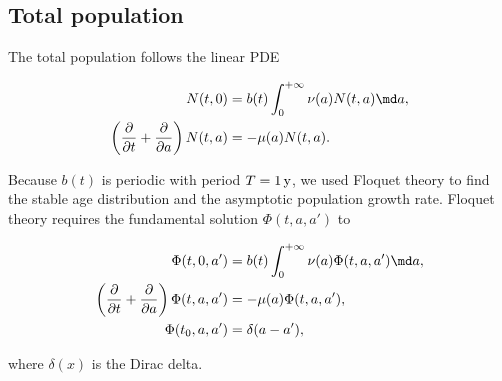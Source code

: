 \documentclass{jpmarticle}
\let\subequationsorig\subequations%
\let\endsubequationsorig\endsubequations%
\renewenvironment{subequations}{
  \subequationsorig
  \renewcommand{\theequation}{\theparentequation.\arabic{equation}}
}{
  \endsubequationsorig
}
\begin{document}
\subsection{Total population}

The total population follows the linear PDE
\begin{subequations}
  \begin{align}
    N(t, 0)
    &= b(t) \int_0^{+\infty} \nu(a) N(t, a) \md a,
    \\
    \left(\frac{\partial}{\partial t}
      + \frac{\partial}{\partial a}\right)
    N(t, a)
    &= - \mu(a) N(t, a).
  \end{align}
\end{subequations}

Because $b(t)$ is periodic with period $T = \unit[1]{y}$, we used
Floquet theory \autocite{parker_1992} to find the stable age
distribution and the asymptotic population growth rate. Floquet theory
requires the fundamental solution $\Phi(t, a, a')$ to
\begin{subequations}
  \begin{align}
    \Phi(t, 0, a')
    &= b(t) \int_0^{+\infty} \nu(a) \Phi(t, a, a') \md a,
    \\
    \left(\frac{\partial}{\partial t}
      + \frac{\partial}{\partial a}\right)
    \Phi(t, a, a')
    &= - \mu(a) \Phi(t, a, a'),
    \\
    \Phi(t_0, a, a')
    &= \delta(a - a'),
  \end{align}
\end{subequations}
where $\delta(x)$ is the Dirac delta.
\end{document}
